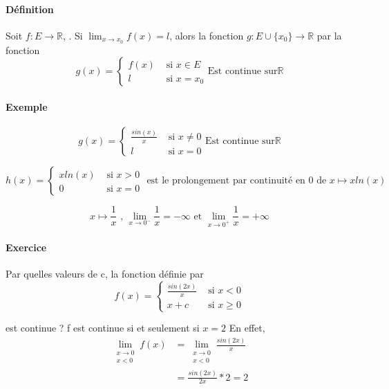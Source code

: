 \paragraph{Définition} Soit $f:E \rightarrow \mathbb{R}$, .
Si $\lim_{x\to x_0} f(x) = l$, alors la fonction $g:E\cup \{x_0\} \rightarrow \mathbb{R}$ par la fonction
	\[g(x) = \left\{
			\begin{array}{rl}
				f(x)& \text{ si } x \in  E \\
				l&\text{ si } x = x_0
			\end{array}
			\right. \text{Est continue sur} \mathbb{R}
		\]

\paragraph{Exemple} 

\[g(x) =
	\left\{
			\begin{array}{rl}
				\frac{sin(x)}{x} & \text{ si } x \neq 0 \\
				l&\text{ si } x = 0
			\end{array}
			\right. \text{Est continue sur} \mathbb{R}
		\]

\[h(x) =
	\left\{
			\begin{array}{rl}
				xln(x) & \text{ si } x > 0 \\
				0&\text{ si } x = 0
			\end{array}
			\right. \text { est le prolongement par continuité en 0 de } x\mapsto xln(x)
		\]

		\[x \mapsto \frac{1}{x} \text{ , } \lim_{x \to 0^-} \frac{1}{x} = -\infty \text{ et }
			\lim_{x \to 0^+} \frac{1}{x} = +\infty \]

\paragraph{Exercice} Par quelles valeurs de c, la fonction définie par 
\[f(x) =
	\left\{
			\begin{array}{rl}
				\frac{sin(2x)}{x} & \text{ si } x < 0 \\
				x+c&\text{ si } x \geq 0
			\end{array}
			\right.
		\]

		est continue ? f est continue si et seulement si $x=2$ En effet, \begin{align*} 
		\lim_{\substack{x\to 0 \\ x < 0}} f(x) &= \lim_{\substack{x\to 0 \\ x <0}} \frac{sin(2x)}{x} \\
									  &= \frac{sin(2x)}{2x} * 2 = 2
		\end{align*}

